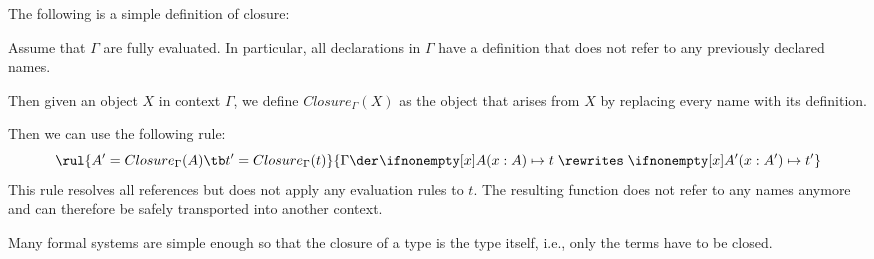 The following is a simple definition of closure:

\begin{definition}[Closure]
Assume that $\Gamma$ are fully evaluated.
In particular, all declarations in $\Gamma$ have a definition that does not refer to any previously declared names.

Then given an object $X$ in context $\Gamma$, we define $Closure_\Gamma(X)$ as the object that arises from $X$ by replacing every name with its definition.
\end{definition}

Then we can use the following rule:
\[\rul{A'=Closure_\Gamma(A) \tb t'=Closure_\Gamma(t)}
      {\evobj{}{\Gamma}{\alam[A]{x}{t}}{\alam[A']{x}{t'}}}
\]
This rule resolves all references but does not apply any evaluation rules to $t$.
The resulting function does not refer to any names anymore and can therefore be safely transported into another context.

Many formal systems are simple enough so that the closure of a type is the type itself, i.e., only the terms have to be closed.
